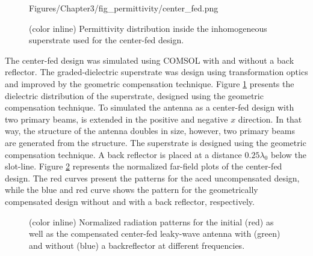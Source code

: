 \begin{figure} [t!]
\centering
 	\begin{overpic}[scale=0.8]{Figures/Chapter3/fig_permittivity/center_fed.png}

  \end{overpic}
  \caption[Permittivity distribution inside the inhomogeneous superstrate used for the center-fed design.]{(color inline) Permittivity distribution inside the inhomogeneous superstrate used for the center-fed design.}
\label{fig:eps_double}
\end{figure}

The center-fed design was simulated using COMSOL with and without a back reflector. The graded-dielectric superstrate was design using transformation optics and improved by the geometric compensation technique. Figure \ref{fig:eps_double} presents the dielectric distribution of the superstrate, designed using the geometric compensation technique. To simulated the antenna as a center-fed design with two primary beams, is extended in the positive and negative $x$ direction. In that way, the structure of the antenna doubles in size, however, two primary beams are generated from the structure. The superstrate is designed using the geometric compensation technique. A back reflector is placed at a distance $0.25 \lambda_0$ below the slot-line. Figure \ref{fig:polar} represents the normalized far-field plots of the center-fed design. The red curves present the patterns for the aced uncompensated design, while the blue and red curve shows the pattern for the geometrically compensated design without and with a back reflector, respectively. 
%
\begin{figure} [th!]
  \begin{center}

 
  \hspace*{\fill}%
  

  

  
  \hspace*{\fill}%
  

  
  
  
  \hspace*{\fill}%
  

  
 \end{center}
  \caption[Normalized radiation patterns for the initial as well as the compensated center-fed leaky-wave antenna with and without a backreflector at different frequencies.] {(color inline) Normalized radiation patterns for the initial (red) as well as the compensated center-fed leaky-wave antenna with (green) and without (blue) a backreflector at different frequencies.}
\label{fig:polar}
\end{figure}
